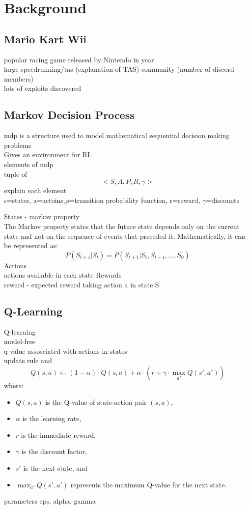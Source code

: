 
\chapter{Background}
\section{Mario Kart Wii}
popular racing game released by Nintendo in year \\ large speedrunning/tas (explanation of TAS) community (number of discord members) \\ lots of exploits discovered\\

\section{Markov Decision Process}
mdp is a structure used to model mathematical sequential decision making problems\\
Gives an environment for RL\\
elements of mdp\\ tuple of
\[ <S, A, P, R, \gamma>\]
explain each element\\ s=states, a=actoins,p=transition probability function, r=reward, $\gamma$=discounts

States - markov property\\
The Markov property states that the future state depends only on the current state and not on the sequence of events that preceded it. Mathematically, it can be represented as:
\[
P(S_{t+1} | S_t) = P(S_{t+1} | S_t, S_{t-1}, \ldots, S_0)
\]
Actions\\
actions available in each state
Rewards\\
reward - expected reward taking action a in state S

\section{Q-Learning}
\cite{watkins1992q} Q-learning \\
model-free\\
q-value assosciated with actions in states\\
update rule and 
\[
Q(s, a) \leftarrow (1 - \alpha) \cdot Q(s, a) + \alpha \cdot \left( r + \gamma \cdot \max_{a'} Q(s', a') \right)
\]
where:
\begin{itemize}
    \item $Q(s, a)$ is the Q-value of state-action pair $(s, a)$,
    \item $\alpha$ is the learning rate,
    \item $r$ is the immediate reward,
    \item $\gamma$ is the discount factor,
    \item $s'$ is the next state, and
    \item $\max_{a'} Q(s', a')$ represents the maximum Q-value for the next state.
\end{itemize}
parameters eps, alpha, gamma\\

